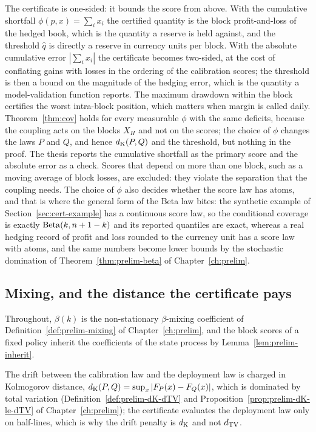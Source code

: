 \documentclass[../../../main.tex]{subfiles}
\begin{document}
\begin{remark}\label{rem:scoremap}
The certificate is one-sided: it bounds the score from above. With the cumulative shortfall $\phi(p,x)=\sum_ix_i$ the certified quantity is the block profit-and-loss of the hedged book, which is the quantity a reserve is held against, and the threshold $\hat q$ is directly a reserve in currency units per block. With the absolute cumulative error $|\sum_ix_i|$ the certificate becomes two-sided, at the cost of conflating gains with losses in the ordering of the calibration scores; the threshold is then a bound on the magnitude of the hedging error, which is the quantity a model-validation function reports. The maximum drawdown within the block certifies the worst intra-block position, which matters when margin is called daily. Theorem~\ref{thm:cov} holds for every measurable $\phi$ with the same deficits, because the coupling acts on the blocks $X_H$ and not on the scores; the choice of $\phi$ changes the laws $P$ and $Q$, and hence $d_{\mathrm{K}}(P,Q)$ and the threshold, but nothing in the proof. The thesis reports the cumulative shortfall as the primary score and the absolute error as a check. Scores that depend on more than one block, such as a moving average of block losses, are excluded: they violate the separation that the coupling needs. The choice of $\phi$ also decides whether the score law has atoms, and that is where the general form of the Beta law bites: the synthetic example of Section~\ref{sec:cert-example} has a continuous score law, so the conditional coverage is exactly $\operatorname{Beta}(k,n+1-k)$ and its reported quantiles are exact, whereas a real hedging record of profit and loss rounded to the currency unit has a score law with atoms, and the same numbers become lower bounds by the stochastic domination of Theorem~\ref{thm:prelim-beta} of Chapter~\ref{ch:prelim}.
\end{remark}

\subsection{Mixing, and the distance the certificate pays}

Throughout, $\beta(k)$ is the non-stationary $\beta$-mixing coefficient of Definition~\ref{def:prelim-mixing} of Chapter~\ref{ch:prelim}, and the block scores of a fixed policy inherit the coefficients of the state process by Lemma~\ref{lem:prelim-inherit}.

The drift between the calibration law and the deployment law is charged in Kolmogorov distance, $d_{\mathrm{K}}(P,Q)=\sup_x|F_P(x)-F_Q(x)|$, which is dominated by total variation (Definition~\ref{def:prelim-dK-dTV} and Proposition~\ref{prop:prelim-dK-le-dTV} of Chapter~\ref{ch:prelim}); the certificate evaluates the deployment law only on half-lines, which is why the drift penalty is $d_{\mathrm{K}}$ and not $d_{\mathrm{TV}}$.
\end{document}
